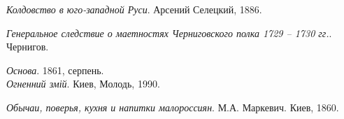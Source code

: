 \emph{Колдовство в юго-западной Руси}. Арсений Селецкий, 1886. 

\emph{Генеральное следствие о маетностях Черниговского полка 1729 – 1730 гг.}. Чернигов.

\emph{Основа}. 1861, серпень.\\
\emph{Огненний змій}. Киев, Молодь, 1990.


\emph{Обычаи, поверья, кухня и напитки малороссиян}. М.А. Маркевич. Киев, 1860.


